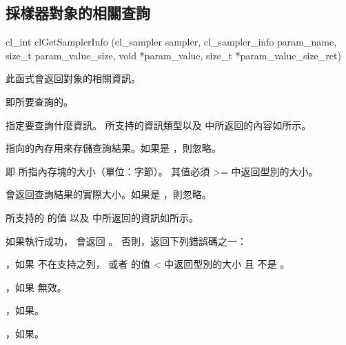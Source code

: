 \subsection{採樣器對象的相關查詢}


\startCLFUNC
cl_int clGetSamplerInfo (cl_sampler sampler,
			cl_sampler_info param_name,
			size_t param_value_size,
			void *param_value,
			size_t *param_value_size_ret)
\stopCLFUNC

此函式會返回對象的相關資訊。

 即所要查詢的。

 指定要查詢什麼資訊。
所支持的資訊類型以及  中所返回的內容如所示。

 指向的內存用來存儲查詢結果。如果是 ，則忽略。

 即  所指內存塊的大小（單位：字節）。
其值必須 >= 中返回型別的大小。

 會返回查詢結果的實際大小。如果是 ，則忽略。

 所支持的  的值
以及  中所返回的資訊如所示。

{}

如果執行成功， 會返回 。
否則，返回下列錯誤碼之一：
\startigBase
\item {}，如果  不在支持之列，
或者  的值 < 中返回型別的大小
且  不是 。

\item {}，如果  無效。
\item {}，如果\scdevfailres。
\item {}，如果\schostfailres。
\stopigBase

